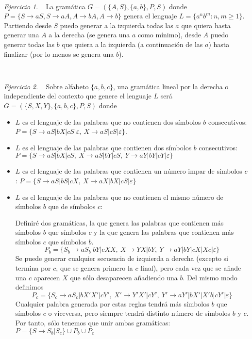 \documentclass[12pt,spanish]{article}
\theoremstyle{definition}
\theoremstyle{remark}
\newtheorem{exercise}{Ejercicio}%
\begin{document}
~
\begin{exercise}~ La gramática $G=(\{A,S\},\{a,b\},P,S)$ donde \\
  $P=\{S\rightarrow aS, S \rightarrow aA, A \rightarrow bA, A
  \rightarrow b\}$ genera el lenguaje $L=\{a^nb^m: n,m \geq 1\}$.
  Partiendo desde $S$ puedo generar a la izquierda todas las $a$ que
  quiera hasta generar una $A$ a la derecha (se genera una $a$ como
  mínimo), desde $A$ puedo generar todas las $b$ que quiera a la
  izquierda (a continuación de las $a$) hasta finalizar (por lo menos
  se genera una $b$).
\end{exercise}
~
\begin{exercise}~ Sobre alfabeto $\{a,b,c\}$, una gramática lineal por
  la derecha o independiente del contexto que genere el lenguaje $L$
  será $G=(\{S,X,Y\},\{a,b,c\},P,S)$ donde
  \begin{itemize}
  \item $L$ es el lenguaje de las palabras que no contienen dos
    símbolos $b$ consecutivos:
    $P=\{S\rightarrow aS|bX|cS|\varepsilon, \ X\rightarrow
    aS|cS|\varepsilon\}$.
  \item $L$ es el lenguaje de las palabras que contienen dos símbolos
    $b$ consecutivos: \\
    $P=\{S\rightarrow aS|bX|cS, \ X\rightarrow aS|bY|cS, \ Y
    \rightarrow aY|bY|cY|\varepsilon\}$
  \item $L$ es el lenguaje de las palabras que contienen un número
    impar de símbolos $c$:
    $P=\{S\rightarrow aS|bS|cX, \ X\rightarrow aX|bX|cS|\varepsilon\}$
  \item $L$ es el lenguaje de las palabras que no contienen el mismo
    número de símbolos $b$ que de símbolos $c$:

    Definiré dos gramáticas, la que genera las palabras que contienen
    más símbolos $b$ que símbolos $c$ y la que genera las palabras que
    contienen más símbolos $c$ que símbolos $b$.
    \[P_b=\{S_b\rightarrow aS_b|bY|cXX, \ X \rightarrow YX|bY, \ Y
      \rightarrow aY|bY|cX|Xc|\varepsilon\}\] Se puede generar
    cualquier secuencia de izquierda a derecha (excepto si termina por
    $c$, que se genera primero la $c$ final), pero cada vez que se
    añade una $c$ aparecen $X$ que sólo desaparecen añadiendo una
    $b$. Del mismo modo definimos
    \[P_c=\{S_c\rightarrow aS_c|bX'X'|cY', \ X' \rightarrow Y'X'|cY',
      \ Y' \rightarrow aY'|bX'|X'b|cY'|\varepsilon\}\] Cualquier palabra
    generada por estas reglas tendrá más símbolos $b$ que símbolos $c$
    o viceversa, pero siempre tendrá distinto número de símbolos $b$ y
    $c$. Por tanto, sólo tenemos que unir ambas gramáticas:
    $P=\{S\rightarrow S_b|S_c\} \cup P_b \cup P_c$
  \end{itemize}
\end{exercise}
\end{document}
